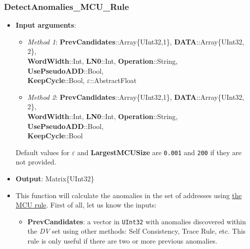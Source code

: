  \subsubsection*{DetectAnomalies\_MCU\_Rule}\label{Fun:DetectAnomaliesMCURule}
 \begin{itemize}
 	\item \textbf{Input arguments}: 
 	\begin{itemize}

 		\item \textit{Method 1}: \textbf{PrevCandidates}::Array\{UInt32,1\}, \textbf{DATA}::Array\{UInt32, 2\}, \\ \textbf{WordWidth}::Int, \textbf{LN0}::Int,  \textbf{Operation}::String, \textbf{UsePseudoADD}::Bool, \\ \textbf{KeepCycle}::Bool,  \textbf{\(\varepsilon\)}::AbstractFloat
 		\item \textit{Method 2}: 			%
 		\textbf{PrevCandidates}::Array\{UInt32,1\}, \textbf{DATA}::Array\{UInt32, 2\}, \\ \textbf{WordWidth}::Int, \textbf{LN0}::Int,  \textbf{Operation}::String, \textbf{UsePseudoADD}::Bool,\\ \textbf{KeepCycle}::Bool
 	\end{itemize}
 	Default values for \textbf{\(\varepsilon\)} and \textbf{LargestMCUSize} are \texttt{0.001} and \texttt{200} if they are not provided.
 	\item \textbf{Output}: Matrix\{UInt32\}
 	\item This function will calculate the anomalies in the set of addresses using \hyperref[Subsec:MCURule]{the MCU rule}. 
 	First of all, let us know the inputs:
 	\begin{itemize}
 		
 		\item \textbf{PrevCandidates}: a vector in \texttt{UInt32} with anomalies discovered within the \textit{DV} set using other methods: Self Consistency, Trace Rule, etc. This rule is only useful if there are two or more previous anomalies. 
 		

\end{itemize}
\end{itemize}

